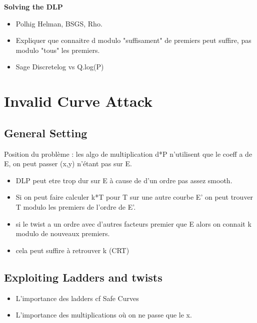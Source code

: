 \documentclass[10pt]{article}
\theoremstyle{definition}
\begin{document}
\noindent \textbf{Solving the DLP}
\begin{itemize}
\item Polhig Helman, BSGS, Rho.
\item Expliquer que connaitre d modulo "suffisament" de premiers peut suffire, pas modulo "tous" les premiers.
\item Sage Discretelog vs Q.log(P)
\end{itemize}


\section{Invalid Curve Attack}
\subsection{General Setting}
Position du problème : les algo de multiplication d*P n'utilisent que le coeff a de E, on peut passer (x,y) n'étant pas sur E.

\begin{itemize}
\item DLP peut etre trop dur sur E à cause de d'un ordre pas assez smooth.
\item Si on peut faire calculer k*T pour T sur une autre courbe E' on peut trouver T modulo les premiers de l'ordre de E'.
\item si le twist a un ordre avec d'autres facteurs premier que E alors on connait k modulo de nouveaux premiers. 
\item cela peut suffire à retrouver k (CRT)
\end{itemize}

\subsection{Exploiting Ladders and twists}
\begin{itemize}
\item L'importance des ladders cf Safe Curves
\item L'importance des multiplications où on ne passe que le x.
\end{itemize}




\end{document}
